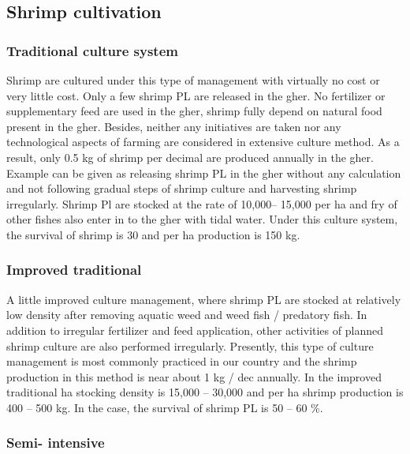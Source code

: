 \documentclass[
]{book}
\begin{document}
\hypertarget{shrimp-cultivation}{%
\subsection{Shrimp cultivation}\label{shrimp-cultivation}}

\hypertarget{traditional-culture-system}{%
\subsubsection{Traditional culture system}\label{traditional-culture-system}}

Shrimp are cultured under this type of management with virtually no cost
or very little cost. Only a few shrimp PL are released in the gher. No
fertilizer or supplementary feed are used in the gher, shrimp fully
depend on natural food present in the gher. Besides, neither any
initiatives are taken nor any technological aspects of farming are
considered in extensive culture method. As a result, only 0.5 kg of
shrimp per decimal are produced annually in the gher. Example can be
given as releasing shrimp PL in the gher without any calculation and not
following gradual steps of shrimp culture and harvesting shrimp
irregularly. Shrimp Pl are stocked at the rate of 10,000-- 15,000 per ha
and fry of other fishes also enter in to the gher with tidal water.
Under this culture system, the survival of shrimp is 30 and per ha
production is 150 kg.

\hypertarget{improved-traditional}{%
\subsubsection{Improved traditional}\label{improved-traditional}}

A little improved culture management, where shrimp PL are stocked at
relatively low density after removing aquatic weed and weed fish /
predatory fish. In addition to irregular fertilizer and feed
application, other activities of planned shrimp culture are also
performed irregularly. Presently, this type of culture management is
most commonly practiced in our country and the shrimp production in this
method is near about 1 kg / dec annually. In the improved traditional ha
stocking density is 15,000 -- 30,000 and per ha shrimp production is 400
-- 500 kg. In the case, the survival of shrimp PL is 50 -- 60 \%.

\hypertarget{semi--intensive}{%
\subsubsection{Semi- intensive}\label{semi--intensive}}
\end{document}
